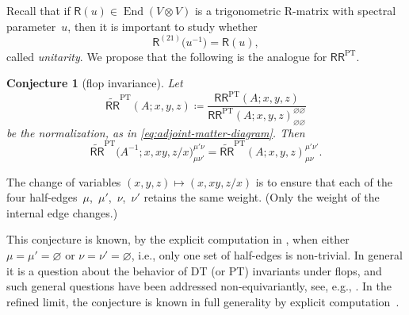 \documentclass[10pt,a4paper]{amsart}
\numberwithin{equation}{section}
\newtheorem{Conjecture}[Theorem]{Conjecture}
 { \theoremstyle{definition}
\newtheorem{Definition}[Theorem]{Definition}
\newtheorem{Example}[Theorem]{Example}
\newtheorem{Remark}[Theorem]{Remark}
\newtheorem{MyParagraph}{}[subsection]
}
\renewcommand{\tilde}[1]{\widetilde{#1}}
\newcommand{\sR}{\mathsf{R}}
\newcommand{\sRR}{\mathsf{RR}}
\DeclareMathOperator{\End}{End}
\DeclareMathOperator{\PT}{PT}
\begin{document}
\begin{MyParagraph}\label{sec:RR-matrix-unitary}
Recall that if $\sR(u) \in \End(V \otimes V)$ is a trigonometric
R-matrix with spectral parameter~$u$, then it is important to study
whether
\[ \sR^{(21)}\big(u^{-1}\big) = \sR(u), \]
called {\it unitarity}. We propose that the following is the analogue
for $\sRR^{\PT}$.

\begin{Conjecture}[flop invariance]
 Let
 \[ \tilde\sRR^{\PT}(A; x,y,z) \coloneqq \frac{\sRR^{\PT}(A; x,y,z)}{\sRR^{\PT}(A; x,y,z)^{\varnothing\varnothing}_{\varnothing\varnothing}} \]
 be the normalization, as in \eqref{eq:adjoint-matter-diagram}. Then
 \[ \tilde\sRR^{\PT}\big(A^{-1}; x, xy, z/x\big)^{\mu'\nu}_{\mu\nu'} = \tilde\sRR^{\PT}(A; x,y,z)^{\mu'\nu'}_{\mu\nu}. \]
\end{Conjecture}

The change of variables $(x,y,z) \mapsto (x, xy, z/x)$ is to ensure
that each of the four half-edges~$\mu$,~$\mu'$,~$\nu$,~$\nu'$ retains the
same weight. (Only the weight of the internal edge changes.)

This conjecture is known, by the explicit computation in
\cite{Kononov2021}, when either $\mu = \mu' = \varnothing$ or $\nu =
\nu' = \varnothing$, i.e., only one set of half-edges is non-trivial. In
general it is a question about the behavior of DT (or PT) invariants
under flops, and such general questions have been addressed
non-equivariantly, see, e.g., \cite{Calabrese2016}. In the refined
limit, the conjecture is known in full generality by explicit
computation~\cite{Awata2009}.
\end{MyParagraph}
\end{document}
